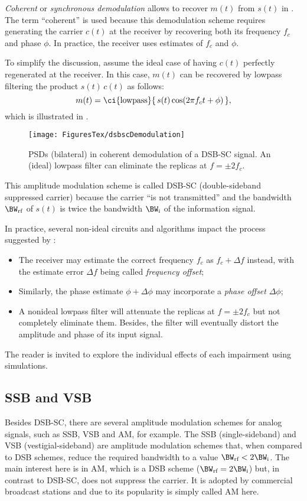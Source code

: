 \emph{Coherent} or \emph{synchronous demodulation} allows to recover $m(t)$ from $s(t)$ in . The term ``coherent'' is used because this demodulation scheme requires generating the carrier $c(t)$ at the receiver by recovering both its frequency $f_c$ and phase $\phi$. In practice, the receiver uses estimates of $f_c$ and $\phi$. 

To simplify the discussion, assume the ideal case of having $c(t)$ perfectly regenerated at the receiver. In this case, $m(t)$ can be recovered by lowpass filtering the product $s(t) \, c(t)$ as follows:
\[
m(t) = \textrm{\ci{lowpass}} \{ \, s(t) \cos(2 \pi f_c t +  \phi) \, \},
\]
which is illustrated in .

\begin{figure}[htbp]
\centering
\texttt{[image: FiguresTex/dsbscDemodulation]}
\caption[PSDs (bilateral) in coherent demodulation of a DSB-SC signal.]{PSDs (bilateral) in coherent demodulation of a DSB-SC signal. An (ideal) lowpass filter can eliminate  the replicas at $f=\pm 2f_c$.\label{fig:dsbscDemodulation}}
\end{figure}

This amplitude modulation scheme is called DSB-SC (double-sideband suppressed carrier) because the carrier ``is not transmitted'' and the bandwidth $\BW_{\textrm{rf}}$ of $s(t)$ is twice the bandwidth $\BW_{\textrm{i}}$ of the information signal. 

In practice, several non-ideal circuits and algorithms impact the process suggested by :
\begin{itemize}
	\item The receiver may estimate the correct frequency $f_c$ as $f_c + \Delta f$ instead, with the estimate error $\Delta f$ being called \emph{frequency offset};
	\item Similarly, the phase estimate $\phi + \Delta \phi$ may incorporate a \emph{phase offset} $\Delta \phi$;
	\item A nonideal lowpass filter will attenuate the replicas at $f=\pm 2f_c$ but not completely eliminate them. Besides, the filter will eventually distort the amplitude and phase of its input signal.
\end{itemize}
The reader is invited to explore the individual effects of each impairment using simulations.

\subsection{SSB and VSB}
Besides DSB-SC, there are several amplitude modulation schemes for analog signals, such as SSB, VSB and AM, for example.
The SSB (single-sideband) and VSB (vestigial-sideband) are amplitude modulation schemes that, when compared to DSB schemes, reduce the required bandwidth to a value $\BW_{\textrm{rf}} < 2\BW_{\textrm{i}}$. The main interest here is in AM, which is a DSB scheme ($\BW_{\textrm{rf}}= 2 \BW_{\textrm{i}}$) but, in contrast to DSB-SC, does not suppress the carrier.
It  is adopted by commercial broadcast stations and due to its popularity is simply called AM here.


